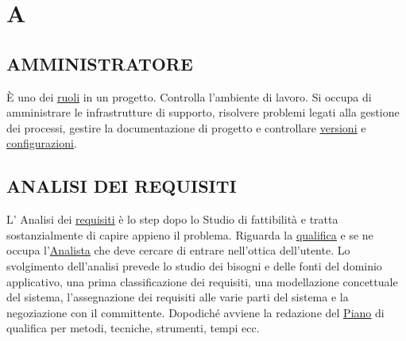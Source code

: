 \flushright{\hyperref[index]{\color{black!65}{Ritorna all'indice}}}\flushleft

	\section{A} \label{sec:A} 
		
		\subsection{AMMINISTRATORE}  \label{amministratore}
		È uno dei \underline{\hyperref[ruoli]{ruoli}} in un progetto. Controlla l'ambiente di lavoro. Si occupa di amministrare le infrastrutture di supporto, risolvere problemi legati alla gestione dei processi, gestire la documentazione di progetto e controllare \underline{\hyperref[versione]{versioni}} e \underline{\hyperref[configurazione]{configurazioni}}.
		
		\subsection{ANALISI DEI REQUISITI}  \label{analisideirequisiti} %
		L' Analisi dei \underline{\hyperref[requirements]{requisiti}} è lo step dopo lo Studio di fattibilità e tratta sostanzialmente di capire appieno il problema. Riguarda la \underline{\hyperref[qualifica]{qualifica}} e se ne occupa l'\underline{\hyperref[analista]{Analista}} che deve cercare di entrare nell'ottica dell'utente. Lo svolgimento dell'analisi prevede lo studio dei bisogni e delle fonti del dominio applicativo, una prima classificazione dei requisiti, una modellazione concettuale del sistema, l'assegnazione dei requisiti alle varie parti del sistema e la negoziazione con il committente. Dopodiché avviene la redazione del \underline{\hyperref[piano]{Piano}} di qualifica per metodi, tecniche, strumenti, tempi ecc. \\
		
